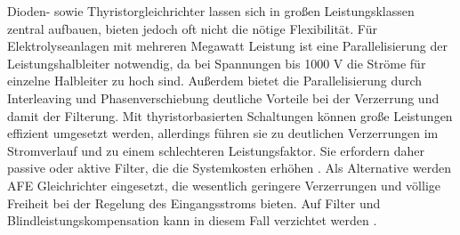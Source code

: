 		Dioden- sowie Thyristorgleichrichter lassen sich in großen Leistungsklassen zentral aufbauen, bieten jedoch oft nicht die nötige Flexibilität. Für Elektrolyseanlagen mit mehreren Megawatt Leistung ist eine Parallelisierung der Leistungshalbleiter notwendig, da bei Spannungen bis 1000 V die Ströme für einzelne Halbleiter zu hoch sind. Außerdem bietet die Parallelisierung durch Interleaving und Phasenverschiebung deutliche Vorteile bei der Verzerrung und damit der Filterung. Mit thyristorbasierten Schaltungen können große Leistungen effizient umgesetzt werden, allerdings führen sie zu deutlichen Verzerrungen im Stromverlauf und zu einem schlechteren Leistungsfaktor. Sie erfordern daher passive oder aktive Filter, die die Systemkosten erhöhen \cite{HydrogenElectronicTopologies}.
		Als Alternative werden \gls{AFE} Gleichrichter eingesetzt, die wesentlich geringere Verzerrungen und völlige Freiheit bei der Regelung des Eingangsstroms bieten. Auf Filter und Blindleistungskompensation kann in diesem Fall verzichtet werden \cite{HydrogenElectronicTopologies}.
		
